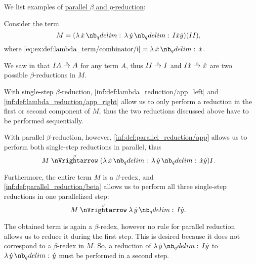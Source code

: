 \begin{example}\label{ex:def:parallel_reduction}
  We list examples of \hyperref[def:parallel_reduction]{parallel \( \beta \) and \( \eta \)-reduction}:
  \begin{thmenum}
     Consider the term
    \begin{equation*}
      M = (\qabs \synx \qabs \syny I \synx \syny)(I I),
    \end{equation*}
    where \( \ref{eq:ex:def:lambda_term/combinator/i} = \qabs \synx \synx \).

    We saw in  that \( I A \bred A \) for any term \( A \), thus \( I I \bred I \) and \( I \synx \bred \synx \) are two possible \( \beta \)-reductions in \( M \).

    With single-step \( \beta \)-reduction, \ref{inf:def:lambda_reduction/app_left} and \ref{inf:def:lambda_reduction/app_right} allow us to only perform a reduction in the first or second component of \( M \), thus the two reductions discussed above have to be performed sequentially.

    With parallel \( \beta \)-reduction, however, \ref{inf:def:parallel_reduction/app} allows us to perform both single-step reductions in parallel, thus
    \begin{equation*}
      M \pbred (\qabs \synx \qabs \syny \synx \syny) I.
    \end{equation*}

    Furthermore, the entire term \( M \) is a \( \beta \)-redex, and \ref{inf:def:parallel_reduction/beta} allows us to perform all three single-step reductions in one parallelized step:
    \begin{equation*}
      M \pbred \qabs \syny I \syny.
    \end{equation*}

    The obtained term is again a \( \beta \)-redex, however no rule for parallel reduction allows us to reduce it during the first step. This is desired because it does not correspond to a \( \beta \)-redex in \( M \). So, a reduction of \( \qabs \syny I \syny \) to \( \qabs \syny \syny \) must be performed in a second step.
  \end{thmenum}
\end{example}

